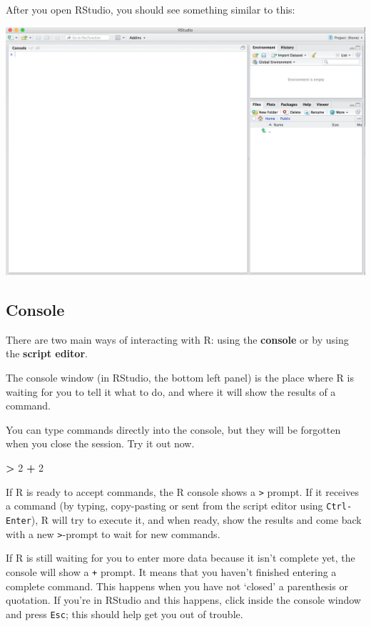 \documentclass[]{book}
\newenvironment{Shaded}{\begin{snugshade}}{\end{snugshade}}
\newcommand{\DecValTok}[1]{\textcolor[rgb]{0.00,0.00,0.81}{#1}}
\newcommand{\StringTok}[1]{\textcolor[rgb]{0.31,0.60,0.02}{#1}}
\newcommand{\OperatorTok}[1]{\textcolor[rgb]{0.81,0.36,0.00}{\textbf{#1}}}
\begin{document}
After you open RStudio, you should see something similar to this:

\begin{center}\includegraphics[width=0.7\linewidth]{img/rstudio} \end{center}

\subsection{Console}\label{console}

There are two main ways of interacting with R: using the
\textbf{console} or by using the \textbf{script editor}.

The console window (in RStudio, the bottom left panel) is the place
where R is waiting for you to tell it what to do, and where it will show
the results of a command.

You can type commands directly into the console, but they will be
forgotten when you close the session. Try it out now.

\begin{Shaded}
\begin{Highlighting}[]
\OperatorTok{>}\StringTok{ }\DecValTok{2} \OperatorTok{+}\StringTok{ }\DecValTok{2}
\end{Highlighting}
\end{Shaded}

If R is ready to accept commands, the R console shows a
\texttt{\textgreater{}} prompt. If it receives a command (by typing,
copy-pasting or sent from the script editor using \texttt{Ctrl-Enter}),
R will try to execute it, and when ready, show the results and come back
with a new \texttt{\textgreater{}}-prompt to wait for new commands.

If R is still waiting for you to enter more data because it isn't
complete yet, the console will show a \texttt{+} prompt. It means that
you haven't finished entering a complete command. This happens when you
have not `closed' a parenthesis or quotation. If you're in RStudio and
this happens, click inside the console window and press \texttt{Esc};
this should help get you out of trouble.
\end{document}
